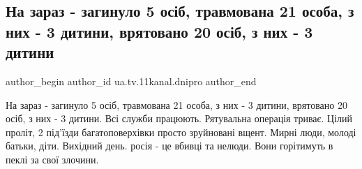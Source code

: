  
 
 
 
 

\subsection{На зараз - загинуло 5 осіб, травмована 21 особа, з них - 3 дитини, врятовано 20 осіб, з них - 3 дитини}
\label{sec:14_01_2023.fb.ua.tv.11kanal.dnipro.1.na_zaraz___zaginulo_}

\ifcmt
 author_begin
   author_id ua.tv.11kanal.dnipro
 author_end
\fi

На зараз - загинуло 5 осіб, травмована 21 особа, з них - 3 дитини, врятовано 20
осіб, з них - 3 дитини. Всі служби працюють. Рятувальна операція триває. Цілий
проліт, 2 під’їзди багатоповерхівки просто зруйновані  вщент. Мирні люди,
молоді батьки, діти. Вихідний день. росія - це вбивці та нелюди. Вони
горітимуть в пеклі за свої злочини.

